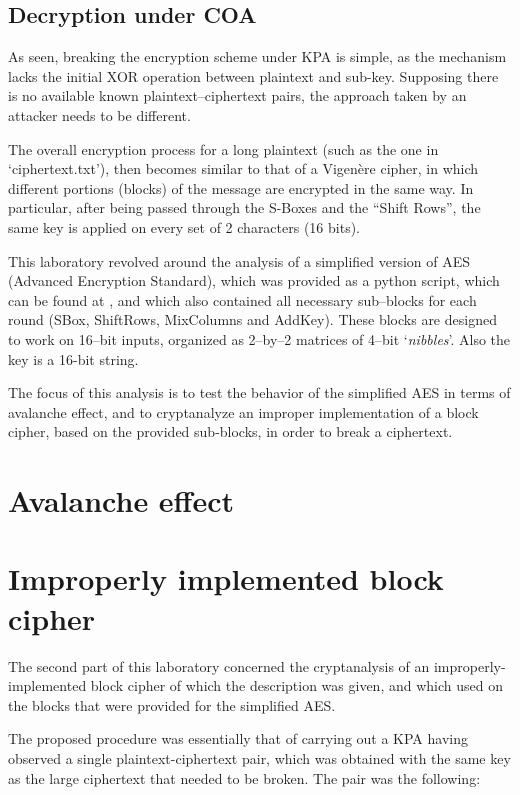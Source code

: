 \documentclass[12pt]{article}
\begin{document}
\subsection{Decryption under COA}
\label{sec:03.1}

As seen, breaking the encryption scheme under KPA is simple, as the mechanism lacks the initial XOR operation between plaintext and sub-key.
Supposing there is no available known plaintext–ciphertext pairs, the approach taken by an attacker needs to be different.

The overall encryption process for a long plaintext (such as the one in `ciphertext.txt'), then becomes similar to that of a Vigenère cipher, in which different portions (blocks) of the message are encrypted in the same way. In particular, after being passed through the S-Boxes and the ``Shift Rows'', the same key is applied on every set of 2 characters (16 bits).
\label{sec:01}

This laboratory revolved around the analysis of a simplified version of AES (Advanced Encryption Standard), which was provided as a python script, which can be found at \cite{Original Python implementation}, and which also contained all necessary sub–blocks for each round (SBox, ShiftRows, MixColumns and AddKey).
These blocks are designed to work on 16–bit inputs, organized as 2–by–2 matrices of 4–bit `\textit{nibbles}'. Also the key is a 16-bit string.

The focus of this analysis is to test the behavior of the simplified AES in terms of avalanche effect, and to cryptanalyze an improper implementation of a block cipher, based on the provided sub-blocks, in order to break a ciphertext.

\section{Avalanche effect}
\label{sec:02}

\section{Improperly implemented block cipher}
\label{sec:03}

The second part of this laboratory concerned the cryptanalysis of an improperly-implemented block cipher of which the description was given, and which used on the blocks that were provided for the simplified AES.

The proposed procedure was essentially that of carrying out a KPA having observed a single plaintext-ciphertext pair, which was obtained with the same key as the large ciphertext that needed to be broken.
The pair was the following:
\end{document}
